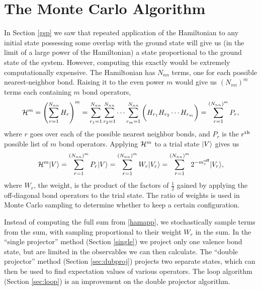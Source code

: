 \section{The Monte Carlo Algorithm}
In Section \ref{gsp} we saw that repeated application of the Hamiltonian to any initial state possessing some overlap with the ground state will
give us (in the limit of a large power of the Hamiltonian) a state proportional to the
ground state of the system.
However, computing this exactly would be extremely computationally expensive.
The Hamiltonian has $N_{nn}$ terms, one for each possible nearest-neighbor bond.  
Raising it to the even power $m$ would give us $(N_{nn})^m$ terms each containing $m$ bond operators,
\begin{equation} \label{bopss}  
	\mathcal{H}^m=\left(\sum_{r=1}^{N_{nn}}H_r\right)^m=
	\sum_{r_1=1}^{N_{nn}}\sum_{r_2=1}^{N_{nn}}\cdots \sum_{r_m=1}^{N_{nn}}
	\bigg( H_{r_1} H_{r_2} \cdots H_{r_m} \bigg) 
	=\sum_{r=1}^{(N_{nn})^m} P_r,
\end{equation}
where $r$ goes over each of the possible nearest neighbor bonds, and $P_r$ is the $r^{\rm th}$ possible list of $m$ bond operators.  
Applying $\mathcal{H}^m$ to a trial state $\lvert {V} \rangle$ gives us
\begin{equation} \label{hamapp}
	\mathcal{H}^m \lvert {V} \rangle = \sum_{r=1}^{(N_{nn})^m} P_r \lvert {V} \rangle = \sum_{r=1}^{(N_{nn})^m} W_r\lvert {V_r} \rangle
	= \sum_{r=1}^{(N_{nn})^m} 2^{-m_r^{\text{off}}}\lvert {V_r} \rangle,
\end{equation}
where $W_r$, the weight, is the product of the factors of $\frac{1}{2}$ gained by applying the off-diagonal bond operators to the trial state.
The ratio of weights is used in Monte Carlo sampling to determine whether to keep a certain configuration.

Instead of computing the full sum from \eqref{hamapp}, we stochastically sample terms
from the sum, with sampling proportional to their weight $W_r$ in the sum.  
In the ``single projector'' method (Section \ref{single}) we project only one valence bond state, but are limited in the observables we can then calculate.
The ``double projector'' method (Section \ref{sec:dubproj}) projects two separate states, which can then be used to find expectation values of various operators.
The loop algorithm (Section \ref{sec:loop}) is an improvement on the double projector algorithm. 

